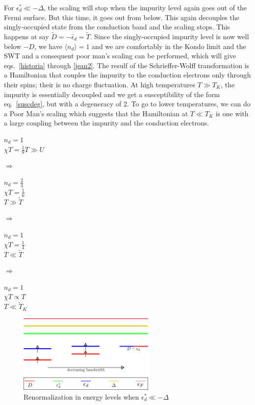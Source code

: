 \documentclass[twoside,11pt]{report}
\numberwithin{equation}{section}
\begin{document}
For \(\epsilon_d^* \ll -\Delta\), the scaling will stop when the impurity level again goes out of the Fermi surface.
But this time, it goes out from below.
This again decouples the singly-occupied state from the conduction band and the scaling stops.
This happens at say \(\widetilde D = -\widetilde {\epsilon_d} = \widetilde {T}\).
Since the singly-occupied impurity level is now well below \(-D\), we have \(\langle  n_d\rangle = 1\) and we are comfortably in the Kondo limit and the SWT and a consequent poor man's scaling can be performed, which will give eqs.~\ref{historia} through \ref{jean2}.
The resulf of the Schrieffer-Wolff transformation is a Hamiltonian that couples the impurity to the conduction electrons only through their spins; their is no charge fluctuation.
At high temperatures \(T \gg T_K\), the impurity is essentially decoupled and we get a susceptibility of the form eq.~\ref{suscdeg}, but with a degeneracy of 2.
To go to lower temperatures, we can do a Poor Man's scaling which suggests that the Hamiltonian at \(T\ll T_K\) is one with a large coupling between the impurity and the conduction electrons.
\begin{center}
\begin{minipage}{50pt}
	\(n_d = 1\)\\\(\chi T = \frac{1}{8}\)\(T\gg U\)
\end{minipage}
\hspace*{20pt}\(\Longrightarrow\)\hspace*{20pt}
\begin{minipage}{50pt}
	\(n_d = \frac{2}{3}\)\\\(\chi T = \frac{1}{6}\)\\\(T\gg \widetilde T\)
\end{minipage}
\hspace*{20pt}\(\Longrightarrow\)\hspace*{20pt}
\begin{minipage}{50pt}
	\(n_d = 1\)\\\(\chi T= \frac{1}{4}\)\\\(T\ll \widetilde T\)
\end{minipage}
\hspace*{20pt}\(\Longrightarrow\)\hspace*{20pt}
\begin{minipage}{50pt}
	\(n_d = 1\)\\\(\chi T \propto T\)\\\(T\ll \widetilde T_K\)
\end{minipage}
\end{center}
\begin{figure}
	\centering 
	\includegraphics[width=0.6\textwidth]{../figures/empty.png}
	\caption{Renormalization in energy levels when \(\epsilon_d^* \ll -\Delta\)}
\end{figure}
\end{document}
